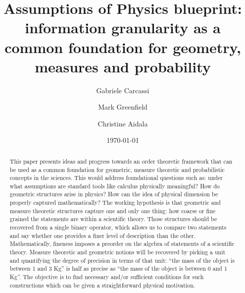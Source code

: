 \documentclass[10pt, onecolumn, nofootinbib]{revtex4-2}
\begin{document}
\title{Assumptions of Physics blueprint: information granularity as a common foundation for geometry, measures and probability}
\author{Gabriele Carcassi}
\author{Mark Greenfield}
\author{Christine Aidala}
\date{\today}

\begin{abstract}
    This paper presents ideas and progress towards an order theoretic framework that can be used as a common foundation for geometric, measure theoretic and probabilistic concepts in the sciences. This would address foundational questions such as: under what assumptions are standard tools like calculus physically meaningful? How do geometric structures arise in physics? How can the idea of physical dimension be properly captured mathematically? The working hypothesis is that geometric and measure theoretic structures capture one and only one thing: how coarse or fine grained the statements are within a scientific theory. Those structures should be recovered from a single binary operator, which allows us to compare two statements and say whether one provides a finer level of description than the other. Mathematically, fineness imposes a preorder on the algebra of statements of a scientific theory. Measure theoretic and geometric notions will be recovered by picking a unit and quantifying the degree of precision in terms of that unit: ``the mass of the object is between 1 and 3 Kg'' is half as precise as ``the mass of the object is between 0 and 1 Kg''. The objective is to find necessary and/or sufficient conditions for such constructions which can be given a straightforward physical motivation.
    

\end{abstract}
\end{document}
